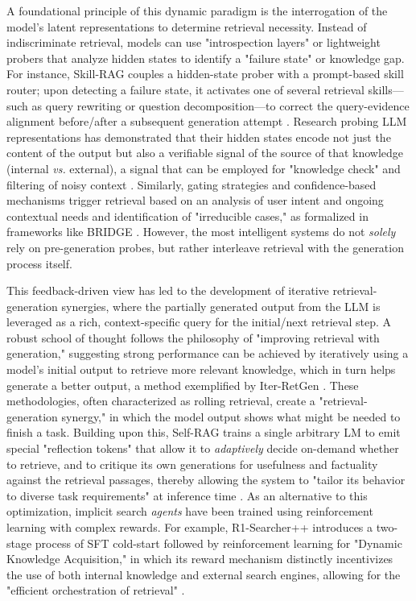 \documentclass[11pt,a4paper]{article}
\begin{document}
A foundational principle of this dynamic paradigm is the interrogation of the model's latent representations to determine retrieval necessity. Instead of indiscriminate retrieval, models can use "introspection layers" or lightweight probers that analyze hidden states to identify a "failure state" or knowledge gap. For instance, Skill-RAG couples a hidden-state prober with a prompt-based skill router; upon detecting a failure state, it activates one of several retrieval skills---such as query rewriting or question decomposition---to correct the query-evidence alignment before/after a subsequent generation attempt \cite{arxiv:2604.15771v3}. Research probing LLM representations has demonstrated that their hidden states encode not just the content of the output but also a verifiable signal of the source of that knowledge (internal \emph{vs.} external), a signal that can be employed for "knowledge check" and filtering of noisy context \cite{arxiv:2411.14572v1}. Similarly, gating strategies and confidence-based mechanisms trigger retrieval based on an analysis of user intent and ongoing contextual needs and identification of "irreducible cases," as formalized in frameworks like BRIDGE \cite{arxiv:2505.17118v2}. However, the most intelligent systems do not \emph{solely} rely on pre-generation probes, but rather interleave retrieval with the generation process itself.

This feedback-driven view has led to the development of iterative retrieval-generation synergies, where the partially generated output from the LLM is leveraged as a rich, context-specific query for the initial/next retrieval step. A robust school of thought follows the philosophy of "improving retrieval with generation," suggesting strong performance can be achieved by iteratively using a model's initial output to retrieve more relevant knowledge, which in turn helps generate a better output, a method exemplified by Iter-RetGen \cite{arxiv:2305.15294v2}. These methodologies, often characterized as rolling retrieval, create a "retrieval-generation synergy," in which the model output shows what might be needed to finish a task. Building upon this, Self-RAG trains a single arbitrary LM to emit special "reflection tokens" that allow it to \emph{adaptively} decide on-demand whether to retrieve, and to critique its own generations for usefulness and factuality against the retrieval passages, thereby allowing the system to "tailor its behavior to diverse task requirements" at inference time \cite{arxiv:2310.11511v1}. As an alternative to this optimization, implicit search \emph{agents} have been trained using reinforcement learning with complex rewards. For example, R1-Searcher++ introduces a two-stage process of SFT cold-start followed by reinforcement learning for "Dynamic Knowledge Acquisition," in which its reward mechanism distinctly incentivizes the use of both internal knowledge and external search engines, allowing for the "efficient orchestration of retrieval" \cite{arxiv:2505.17005v1}.
\end{document}
